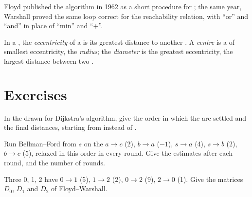 \label{out:b1:shortest-paths:floyd}

Floyd published the algorithm in 1962 as a short procedure for ; the same year, Warshall proved the
same loop correct for the reachability relation, with ``or'' and ``and'' in place of ``min'' and ``$+$''.

\begin{definition}\label{def:b1:shortest-paths:centre}
In a  , the \emph{eccentricity} of a  is its greatest
distance to another . A \emph{centre} is a  of smallest eccentricity, the
\emph{radius}; the \emph{diameter} is the greatest eccentricity, the largest distance
between two .
\end{definition}

\section{Exercises}\label{sec:b1:shortest-paths:exercises}

\begin{exercise}[$\star$]\label{exo:b1:shortest-paths:1}
In the  drawn for Dijkstra's algorithm, give the order in which the  are settled and the final distances, starting
from  instead of .
\end{exercise}

\begin{exercise}[$\star$]\label{exo:b1:shortest-paths:2}
Run Bellman--Ford from $s$ on the  $a \to c$ (2), $b \to a$ ($-1$), $s \to a$ (4), $s \to b$ (2), $b \to c$ (5),
relaxed in this order in every round. Give the estimates after each round, and the number of rounds.
\end{exercise}

\begin{exercise}[$\star$]\label{exo:b1:shortest-paths:3}
Three  0, 1, 2 have  $0 \to 1$ (5), $1 \to 2$ (2), $0 \to 2$ (9), $2 \to 0$ (1). Give the matrices $D_0$, $D_1$
and $D_2$ of Floyd--Warshall.
\end{exercise}

